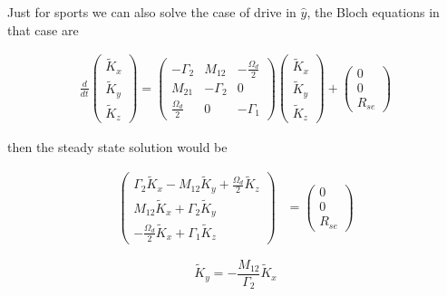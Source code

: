 \documentclass{article}
\begin{document}
Just for sports we can also solve the case of drive in $\hat{y}$, the Bloch equations in that case are

\begin{align}
    \boxed{\frac{d}{dt}\left(\begin{array}{c}
        \tilde{K}_{x}\\
        \tilde{K}_{y}\\
        \tilde{K}_{z}
    \end{array}\right)=
   \left(\begin{matrix}
    -\Gamma_2 & M_{12}    &  -\frac{\Omega_d}{2} \\
    M_{21} &  - \Gamma_2 &  0 \\ \frac{\Omega_d}{2} &   0 &  -\Gamma_1 
    \end{matrix}\right)
    \left(\begin{array}{c}
        \tilde{K}_{x}\\
        \tilde{K}_{y}\\
        \tilde{K}_{z}
    \end{array}\right) + 
    \left(\begin{matrix}
         0  \\
         0  \\
         R_{se} 
    \end{matrix}\right)}\label{eq:Bloch_equations_y_drive}
\end{align}

then the steady state solution would be

\begin{align}
    \left(\begin{array}{c}
        \Gamma_2\tilde{K}_{x} - M_{12}\tilde{K}_{y} + \frac{\Omega_d}{2}\tilde{K}_{z}\\
        M_{12}\tilde{K}_{x}+\Gamma_2\tilde{K}_{y}\\
        -\frac{\Omega_d}{2}\tilde{K}_{x}+\Gamma_1\tilde{K}_{z}
    \end{array}\right)&=
    \left(\begin{array}{c}
        0\\
        0\\
        R_{se} 
    \end{array}\right)
\end{align}


$$\tilde{K}_y = - \frac{M_{12}}{\Gamma_2}\tilde{K}_x$$
\end{document}
